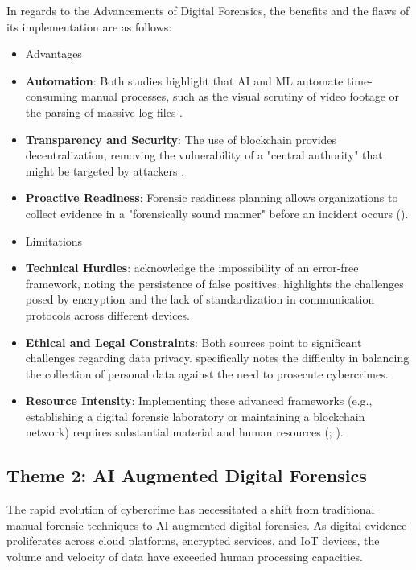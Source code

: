 \documentclass[12pt,a4paper]{article}
\begin{document}
In regards to the Advancements of Digital Forensics, the benefits and the flaws of its implementation are as follows: 
\begin{itemize}
\item[$\blacksquare$] Advantages
\item \textbf{Automation}: Both studies highlight that AI and ML automate time-consuming manual processes, such as the visual scrutiny of video footage or the parsing of massive log files \cite{alenezi2023digital}.
\item \textbf{Transparency and Security}: The use of blockchain provides decentralization, removing the vulnerability of a "central authority" that might be targeted by attackers \cite{vaddi2024enhancements}.
\item \textbf{Proactive Readiness}: Forensic readiness planning allows organizations to collect evidence in a "forensically sound manner" before an incident occurs (\cite{alenezi2023digital}).
\item[$\blacksquare$] Limitations
\item \textbf{Technical Hurdles}: \cite{vaddi2024enhancements} acknowledge the impossibility of an error-free framework, noting the persistence of false positives. \cite{alenezi2023digital} highlights the challenges posed by encryption and the lack of standardization in communication protocols across different devices.
\item \textbf{Ethical and Legal Constraints}: Both sources point to significant challenges regarding data privacy. \cite{alenezi2023digital} specifically notes the difficulty in balancing the collection of personal data against the need to prosecute cybercrimes.
\item \textbf{Resource Intensity}: Implementing these advanced frameworks (e.g., establishing a digital forensic laboratory or maintaining a blockchain network) requires substantial material and human resources (\cite{alenezi2023digital}; \cite{vaddi2024enhancements}).
\end{itemize}

\subsection{Theme 2: AI Augmented Digital Forensics}

The rapid evolution of cybercrime has necessitated a shift from traditional manual forensic techniques to AI-augmented digital forensics. As digital evidence proliferates across cloud platforms, encrypted services, and IoT devices, the volume and velocity of data have exceeded human processing capacities. 
\end{document}
